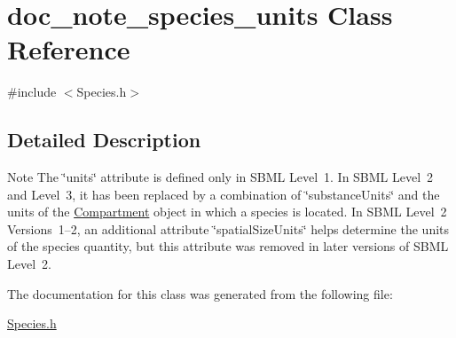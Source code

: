 \hypertarget{classdoc__note__species__units}{}\section{doc\+\_\+note\+\_\+species\+\_\+units Class Reference}
\label{classdoc__note__species__units}


{\ttfamily \#include $<$Species.\+h$>$}



\subsection{Detailed Description}
\begin{DoxyNote}{Note}
The \char`\"{}units\char`\"{} attribute is defined only in S\+B\+ML Level~1. In S\+B\+ML Level~2 and Level~3, it has been replaced by a combination of \char`\"{}substance\+Units\char`\"{} and the units of the \hyperlink{class_compartment}{Compartment} object in which a species is located. In S\+B\+ML Level~2 Versions~1--2, an additional attribute \char`\"{}spatial\+Size\+Units\char`\"{} helps determine the units of the species quantity, but this attribute was removed in later versions of S\+B\+ML Level~2. 
\end{DoxyNote}


The documentation for this class was generated from the following file\+:\begin{DoxyCompactItemize}
\item 
\hyperlink{_species_8h}{Species.\+h}\end{DoxyCompactItemize}
